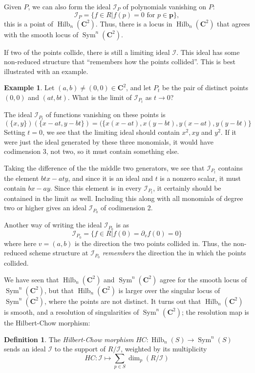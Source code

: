 \documentclass{amsart}[12pt]
\theoremstyle{definition}
\newtheorem{example}[dummy]{Example}
\newtheorem{definition}[dummy]{Definition}
\newcommand{\C}{\mathbf{C}}
\DeclareMathOperator{\Hilb}{Hilb}
\DeclareMathOperator{\Sym}{Sym}
\begin{document}
Given $P$, we can also form the ideal $\mathcal{I}_P$ of polynomials vanishing on $P$:
 $$\mathcal{I}_{P}=\{f\in R| f(p)=0 \text{ for }p\in \mathbf{p}\},$$  
this is a point of $\Hilb_n(\C^2)$.  Thus, there is a locus in $\Hilb_n(\C^2)$ that agrees with the smooth locus of $\Sym^n(\C^2)$. 

 If two of the points collide, there is still a limiting ideal $\mathcal{I}$.  This ideal has some non-reduced structure that ``remembers how the points collided''.  This is best illustrated with an example.


\begin{example}
Let $(a,b)\neq (0,0)\in\C^2$, and let $P_t$ be the pair of distinct points $(0,0)$ and $(at,bt)$.  What is the limit of $\mathcal{I}_{P_t}$ as $t\to 0$?


The ideal $\mathcal{I}_{P_t}$ of functions vanishing on these points is 
$$(\{x,y\})(\{x-at,y-bt\})=(\{x(x-at),x(y-bt), y(x-at), y(y-bt)\}$$
Setting $t=0$, we see that the limiting ideal should contain $x^2, xy$ and $y^2$.  If it were just the ideal generated by these three monomials, it would have codimension 3, not two, so it must contain something else.

Taking the difference of the the middle two generators, we see that $\mathcal{I}_{P_t}$ contains the element $btx-aty$, and since it is an ideal and $t$ is a nonzero scalar, it must contain $bx-ay$.  Since this element is in every $\mathcal{I}_{P_t}$, it certainly should be contained in the limit as well.  Including this along with all monomials of degree two or higher gives an ideal $\mathcal{I}_{P_0}$ of codimension 2.

Another way of writing the ideal $\mathcal{I}_{P_0}$ is as 
$$\mathcal{I}_{P_0}=\{f\in R| f(0)=\partial_vf(0)=0\}$$
where here $v=(a,b)$ is the direction the two points collided in.  Thus, the non-reduced scheme structure at $\mathcal{I}_{P_0}$ \emph{remembers} the direction the in which the points collided. 
\end{example}

We have seen that $\Hilb_n(\C^2)$ and $\Sym^n(\C^2)$ agree for the smooth locus of $\Sym^n(\C^2)$, but that $\Hilb_n(\C^2)$ is larger over the singular locus of $\Sym^n(\C^2)$, where the points are not distinct.  It turns out that $\Hilb_n(\C^2)$ is smooth, and a resolution of singularities of $\Sym^n(\C^2)$; the resolution map is the Hilbert-Chow morphism:

\begin{definition}
The \emph{Hilbert-Chow morphism} $HC:\Hilb_n(S)\to\Sym^n(S)$ sends an ideal $\mathcal{I}$ to the support of $R/\mathcal{I}$, weighted by its multiplicity
$$HC:\mathcal{I}\mapsto \sum_{p\in S} \dim_p (R/\mathcal{I})$$
\end{definition}
\end{document}
